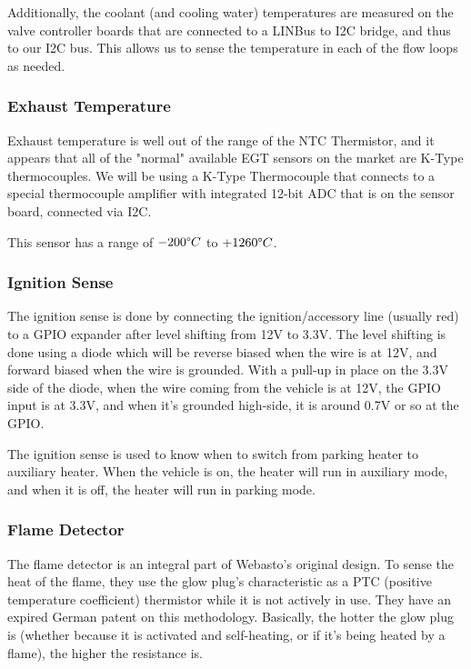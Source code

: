 \documentclass[lettersize,journal]{IEEEtran}
\begin{document}
Additionally, the coolant (and cooling water) temperatures are measured on the valve controller boards that are connected to a LINBus to I2C bridge, and thus to our I2C bus.  This allows us to sense the temperature in each of the flow loops as needed.

\subsubsection{Exhaust Temperature}
Exhaust temperature is well out of the range of the NTC Thermistor, and it appears that all of the "normal" available EGT sensors on the market are K-Type thermocouples.  We will be using a K-Type Thermocouple that connects to a special thermocouple amplifier with integrated 12-bit ADC that is on the sensor board, connected via I2C.

This sensor has a range of $-200 \degree C$ to $+1260 \degree C$.

\subsubsection{Ignition Sense}
The ignition sense is done by connecting the ignition/accessory line (usually red) to a GPIO expander after level shifting from 12V to 3.3V.  The level shifting is done using a diode which will be reverse biased when the wire is at 12V, and forward biased when the wire is grounded.  With a pull-up in place on the 3.3V side of the diode, when the wire coming from the vehicle is at 12V, the GPIO input is at 3.3V, and when it's grounded high-side, it is around 0.7V or so at the GPIO.

The ignition sense is used to know when to switch from parking heater to auxiliary heater.   When the vehicle is on, the heater will run in auxiliary mode, and when it is off, the heater will run in parking mode.

\subsubsection{Flame Detector}
The flame detector is an integral part of Webasto's original design.  To sense the heat of the flame, they use the glow plug's characteristic as a PTC (positive temperature coefficient) thermistor while it is not actively in use.  They have an expired German patent on this methodology.  Basically, the hotter the glow plug is (whether because it is activated and self-heating, or if it's being heated by a flame), the higher the resistance is.
\end{document}
